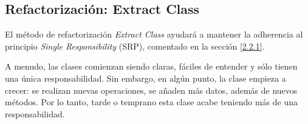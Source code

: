\subsection{Refactorización: Extract Class}
\label{2.2.4}

El método de refactorización {\it Extract Class}\cite{Fowler:1999} ayudará a mantener la adherencia al principio {\it Single Responsibility} (SRP), comentado en la sección \ref{2.2.1}.
\bigskip

A menudo, las clases comienzan siendo claras, fáciles de entender y sólo tienen una única responsabilidad. Sin embargo, en algún punto, la clase empieza a crecer: se realizan nuevas operaciones, se añaden más datos, además de nuevos métodos.
Por lo tanto, tarde o temprano esta clase acabe teniendo más de una responsabilidad.
\bigskip






